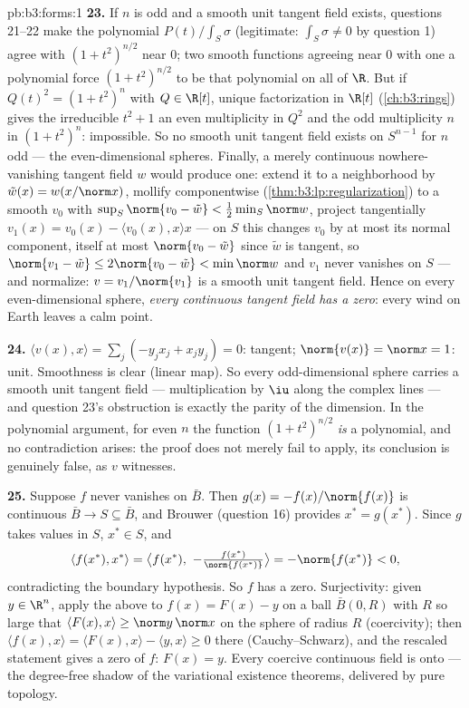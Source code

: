 \begin{solution}{pb:b3:forms:1}
\textbf{23.} If $n$ is odd and a smooth unit tangent field
exists, questions 21--22 make the polynomial
$P(t)/\int_S\sigma$ (legitimate: $\int_S\sigma \neq 0$ by
question 1) agree with $(1 + t^2)^{n/2}$ near $0$; two
smooth functions agreeing near $0$ with one a polynomial
force $(1 + t^2)^{n/2}$ to be that polynomial on all of
$\R$. But if $Q(t)^2 = (1 + t^2)^n$ with $Q \in \R[t]$,
unique factorization in $\R[t]$
(\cref{ch:b3:rings}) gives the irreducible $t^2 + 1$ an even
multiplicity in $Q^2$ and the odd multiplicity $n$ in
$(1 + t^2)^n$: impossible. So no smooth unit tangent field
exists on $S^{n-1}$ for $n$ odd --- the even-dimensional
spheres. Finally, a merely continuous nowhere-vanishing
tangent field $w$ would produce one: extend it to a
neighborhood by $\tilde w(x) = w(x/\norm x)$, mollify
componentwise (\cref{thm:b3:lp:regularization}) to a smooth
$v_0$ with $\sup_S\norm{v_0 - \tilde w} <
\frac12\min_S\norm w$, project tangentially $v_1(x) = v_0(x)
- \langle v_0(x), x\rangle x$ --- on $S$ this changes $v_0$
by at most its normal component, itself at most $\norm{v_0 -
\tilde w}$ since $\tilde w$ is tangent, so $\norm{v_1 - \tilde
w} \leq 2\norm{v_0 - \tilde w} < \min\norm w$ and $v_1$
never vanishes on $S$ --- and normalize: $v =
v_1/\norm{v_1}$ is a smooth unit tangent field. Hence on
every even-dimensional sphere, \emph{every continuous
tangent field has a zero}: every wind on Earth leaves a calm
point.

\textbf{24.} $\langle v(x), x\rangle = \sum_j(-y_jx_j +
x_jy_j) = 0$: tangent; $\norm{v(x)} = \norm x = 1$: unit.
Smoothness is clear (linear map). So every odd-dimensional
sphere carries a smooth unit tangent field --- multiplication
by $\iu$ along the complex lines --- and question 23's
obstruction is exactly the parity of the dimension. In the
polynomial argument, for even $n$ the function $(1 +
t^2)^{n/2}$ \emph{is} a polynomial, and no contradiction
arises: the proof does not merely fail to apply, its
conclusion is genuinely false, as $v$ witnesses.

\textbf{25.} Suppose $f$ never vanishes on $\bar B$. Then
$g(x) = -f(x)/\norm{f(x)}$ is continuous $\bar B \to S
\subseteq \bar B$, and Brouwer (question 16) provides $x^* =
g(x^*)$. Since $g$ takes values in $S$, $x^* \in S$, and
\[
\langle f(x^*), x^*\rangle = \bigl\langle f(x^*),\
-\tfrac{f(x^*)}{\norm{f(x^*)}}\bigr\rangle
= -\norm{f(x^*)} < 0,
\]
contradicting the boundary hypothesis. So $f$ has a zero.
Surjectivity: given $y \in \R^n$, apply the above to $f(x) =
F(x) - y$ on a ball $\bar B(0, R)$ with $R$ so large that
$\langle F(x), x\rangle \geq \norm y\,\norm x$ on the sphere
of radius $R$ (coercivity); then $\langle f(x), x\rangle =
\langle F(x), x\rangle - \langle y, x\rangle \geq 0$ there
(Cauchy--Schwarz), and the rescaled statement gives a zero
of $f$: $F(x) = y$. Every coercive continuous field is onto
--- the degree-free shadow of the variational existence
theorems, delivered by pure topology.
\end{solution}
